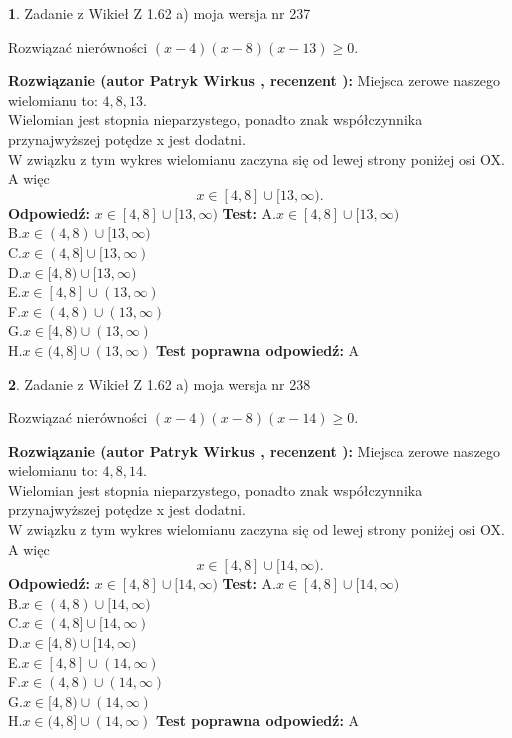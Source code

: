 \documentclass[12pt, a4paper]{article}
\theoremstyle{definition} %
\newtheorem{zad}{}
\newcommand{\zadStart}[1]{\begin{zad}#1\newline}
\newcommand{\zadStop}{\end{zad}}
\newcommand{\rozwStart}[2]{\noindent \textbf{Rozwiązanie (autor #1 , recenzent #2): }\newline}
\newcommand{\rozwStop}{\newline}
\newcommand{\odpStart}{\noindent \textbf{Odpowiedź:}\newline}
\newcommand{\odpStop}{\newline}
\newcommand{\testStart}{\noindent \textbf{Test:}\newline}
\newcommand{\testStop}{\newline}
\newcommand{\kluczStart}{\noindent \textbf{Test poprawna odpowiedź:}\newline}
\newcommand{\kluczStop}{\newline}
\begin{document}
\zadStart{Zadanie z Wikieł Z 1.62 a) moja wersja nr 237}

Rozwiązać nierówności $(x-4)(x-8)(x-13)\ge0$.
\zadStop
\rozwStart{Patryk Wirkus}{}
Miejsca zerowe naszego wielomianu to: $4, 8, 13$.\\
Wielomian jest stopnia nieparzystego, ponadto znak współczynnika przy\linebreak najwyższej potędze x jest dodatni.\\ W związku z tym wykres wielomianu zaczyna się od lewej strony poniżej osi OX. A więc $$x \in [4,8] \cup [13,\infty).$$
\rozwStop
\odpStart
$x \in [4,8] \cup [13,\infty)$
\odpStop
\testStart
A.$x \in [4,8] \cup [13,\infty)$\\
B.$x \in (4,8) \cup [13,\infty)$\\
C.$x \in (4,8] \cup [13,\infty)$\\
D.$x \in [4,8) \cup [13,\infty)$\\
E.$x \in [4,8] \cup (13,\infty)$\\
F.$x \in (4,8) \cup (13,\infty)$\\
G.$x \in [4,8) \cup (13,\infty)$\\
H.$x \in (4,8] \cup (13,\infty)$
\testStop
\kluczStart
A
\kluczStop



\zadStart{Zadanie z Wikieł Z 1.62 a) moja wersja nr 238}

Rozwiązać nierówności $(x-4)(x-8)(x-14)\ge0$.
\zadStop
\rozwStart{Patryk Wirkus}{}
Miejsca zerowe naszego wielomianu to: $4, 8, 14$.\\
Wielomian jest stopnia nieparzystego, ponadto znak współczynnika przy\linebreak najwyższej potędze x jest dodatni.\\ W związku z tym wykres wielomianu zaczyna się od lewej strony poniżej osi OX. A więc $$x \in [4,8] \cup [14,\infty).$$
\rozwStop
\odpStart
$x \in [4,8] \cup [14,\infty)$
\odpStop
\testStart
A.$x \in [4,8] \cup [14,\infty)$\\
B.$x \in (4,8) \cup [14,\infty)$\\
C.$x \in (4,8] \cup [14,\infty)$\\
D.$x \in [4,8) \cup [14,\infty)$\\
E.$x \in [4,8] \cup (14,\infty)$\\
F.$x \in (4,8) \cup (14,\infty)$\\
G.$x \in [4,8) \cup (14,\infty)$\\
H.$x \in (4,8] \cup (14,\infty)$
\testStop
\kluczStart
A
\kluczStop
\end{document}
